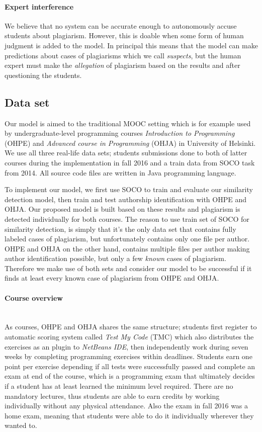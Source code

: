 \paragraph{Expert interference}
We believe that no system can be accurate enough to autonomously accuse students about plagiarism. However, this is doable when some form of human judgment is added to the model. In principal this means that the model can make predictions about cases of plagiarisms which we call \emph{suspects}, but the human expert must make the \emph{allegation} of plagiarism based on the results and after questioning the students.  

\subsection{Data set}

Our model is aimed to the traditional MOOC setting which is for example used by  undergraduate-level programming courses \emph{Introduction to Programming} (OHPE) and \emph{Advanced course in Programming} (OHJA) in University of Helsinki. We use all three real-life data sets; students submissions done to both of latter courses during the implementation in fall 2016 and a train data from SOCO task from 2014. All source code files are written in Java programming language. 

To implement our model, we first use SOCO to train and evaluate our similarity detection model, then train and test authorship identification with OHPE and OHJA. Our proposed model is built based on these results and plagiarism is detected individually for both courses. The reason to use train set of SOCO for similarity detection, is simply that it's the only data set that contains fully labeled cases of plagiarism, but unfortunately contains only one file per author. OHPE and OHJA on the other hand, contains multiple files per author making author identification possible, but only a few \emph{known} cases of plagiarism. Therefore we make use of both sets and consider our model to be successful if it finds at least every known case of plagiarism from OHPE and OHJA.

\paragraph{Course overview}\mbox{}\\
As courses, OHPE and OHJA shares the same structure; students first register to automatic scoring system called \emph{Test My Code} (TMC) which also distributes the exercises as an plugin to \emph{NetBeans IDE}, then independently work during seven weeks by completing programming exercises within deadlines. Students earn one point per exercise depending if all tests were successfully passed and complete an exam at end of the course, which is a programming exam that ultimately decides if a student has at least learned the minimum level required. There are no mandatory lectures, thus students are able to earn credits by working individually without any physical attendance. Also the exam in fall 2016 was a home exam, meaning that students were able to do it individually wherever they wanted to. 

